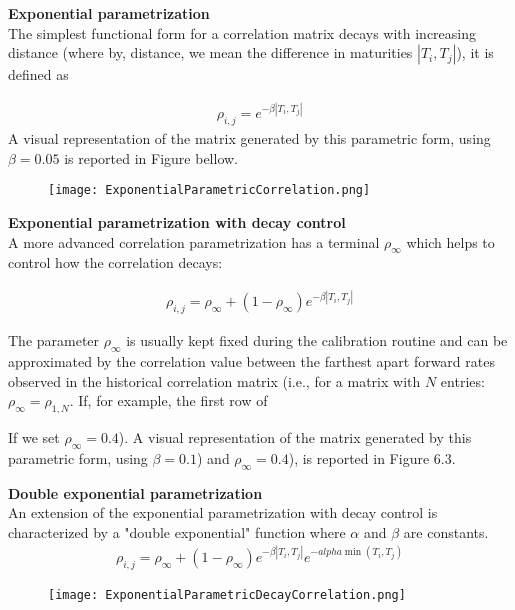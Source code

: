 \documentclass[11pt]{article}
\numberwithin{equation}{subsection}
\begin{document}
\textbf{Exponential parametrization}\\
The simplest functional form for a correlation matrix decays with increasing distance (where by, distance, we mean the difference in maturities \(|T_i, T_j|\)), it is defined as

\begin{eqnarray}
	\rho_{i, j} = e^{-\beta|T_i, T_j|}
\end{eqnarray}
A visual representation of the matrix generated by this parametric form, using \(\beta = 0.05\) is reported in Figure bellow. 
\begin{figure}[H]
	\texttt{[image: ExponentialParametricCorrelation.png]}
\end{figure}

\textbf{Exponential parametrization with decay control}\\
A more advanced correlation parametrization has a terminal \(\rho_{\infty}\) which helps to control how the correlation decays:

\begin{eqnarray}
	\rho_{i, j} = \rho_{\infty} + (1-\rho_{\infty}) e^{-\beta|T_i, T_j|}
\end{eqnarray}

The parameter \(\rho_{\infty}\) is usually kept fixed during the calibration routine and can be approximated by the correlation value between the farthest apart forward rates observed in the historical correlation matrix (i.e., for a matrix with \(N\) entries: \(\rho_{\infty}= \rho_{1, N}\). If, for example, the first row of

If we set \(\rho_{\infty} = 0.4\)). A visual representation of the matrix generated by this parametric form, using \(\beta = 0.1\))  and \(\rho_{\infty} = 0.4\)), is reported in Figure 6.3.

\textbf{Double exponential parametrization}\\
An extension of the exponential parametrization with decay control is characterized by a "double exponential" function
where \(\alpha\) and \(\beta\) are constants. 
\begin{eqnarray}
\rho_{i, j} = \rho_{\infty} + (1-\rho_{\infty}) e^{-\beta|T_i, T_j|} e^{-alpha \min(T_i, T_j)}
\end{eqnarray}

\begin{figure}[H]
	\texttt{[image: ExponentialParametricDecayCorrelation.png]}
\end{figure}
\end{document}
